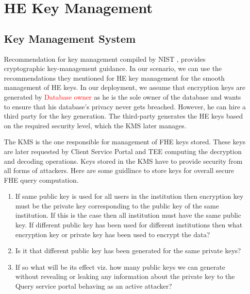 
\chapter{HE Key Management}
\setcounter{section}{0}

\section{Key Management System}

Recommendation for key management compiled by NIST \cite{KMSV5},\cite{KMS} provides cryptographic key-management guidance. In our scenario, we can use the recommendations they mentioned for HE key management for the smooth management of HE keys. In our deployment, we assume that encryption keys are generated by \textcolor{red}{Database owner} as he is the sole owner of the database and wants to ensure that his database's privacy never gets breached. However, he can hire a third party for the key generation. The third-party generates the HE keys based on the required security level, which the KMS later manages.

The KMS is the one responsible for management of FHE keys stored. These keys are later requested by Client Service Portal and TEE computing the decryption and decoding operations. Keys stored in the KMS have to provide security from all forms of attackers. Here are some guidlince to store keys for overall secure FHE query computation.

\begin{enumerate}
    \item If same public key is used for all users in the institution then encryption key must be the private key corresponding to the public key of the same institution. If this is the case then all institution must have the same public key. If different public key has been used for different institutions then what encryption key or private key has been used to encrypt the data?

    \item Is it that different public key has been generated for the same private keys?

    \item If so what will be its effect viz. how many public keys we can generate without revealing or leaking any information about the private key to the Query service portal behaving as an active attacker?
\end{enumerate}





